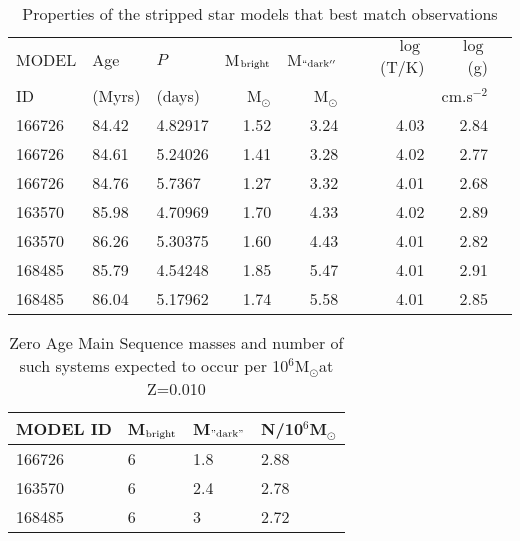 \documentclass[fleqn,usenatbib]{mnras}
\newcommand{\msol} {M$_{\odot}$}
\begin{document}
\begin{table}
    \centering
     \caption{Properties of the stripped star models that best match observations}
    \begin{tabular}{lllrrrrr}
     \hline
     MODEL  & Age  &   $P$  &    M$_{\rm bright}$ &    M$_{\rm ``dark''}$ &  $\log$(T/K) & $\log$(g) \\
     ID &  (Myrs) &  (days) &    \msol &    \msol &   & cm.s$^{-2}$\\
    \hline
   166726 &  84.42 &  4.82917 &  1.52 &  3.24 &     4.03 & 2.84\\
   166726 &  84.61 &  5.24026 &  1.41 &  3.28 &     4.02 & 2.77 \\
   166726 &  84.76 &   5.7367 &  1.27 &  3.32 &     4.01 & 2.68 \\
   \hline
   163570 &  85.98 &  4.70969 &  1.70 &  4.33 &     4.02 & 2.89\\
   163570 &  86.26 &  5.30375 &  1.60 &  4.43 &     4.01 & 2.82\\
   \hline
   168485 &  85.79 &  4.54248 &  1.85 &  5.47 &     4.01 & 2.91\\
   168485 &  86.04 &  5.17962 &  1.74 &  5.58 &     4.01 & 2.85\\
   \hline
    \end{tabular}
    \label{tab:observation_match}
\end{table}

\begin{table}
    \centering
    \caption{Zero Age Main Sequence masses and number of such systems expected to occur per 10$^6$\msol at Z=0.010}
    \label{tab:zams}
    \begin{tabular}{llll}
\hline
        MODEL ID & M$_{\rm bright}$ &    M$_{\rm "dark"}$ & N/10$^6$\msol  \\
          \hline
        166726 &       6 &     1.8 &   2.88\\
        163570 &       6 &     2.4 &   2.78 \\
        168485 &       6 &       3 &  2.72 \\
  \hline
    \end{tabular}

\end{table}
\end{document}
